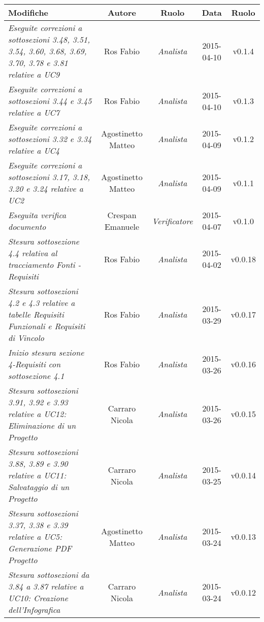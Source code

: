 \begin{table}[h]
\centering
\begin{tabular}{|p{}|c|c|c|c|}
	\toprule
		\textbf{Modifiche} & \textbf{Autore} & \textbf{Ruolo} & \textbf{Data} & \textbf{Ruolo} \\
	\midrule
	\midrule
		\textit{Eseguite correzioni a sottosezioni 3.48, 3.51, 3.54, 3.60, 3.68, 3.69, 3.70, 3.78  e 3.81 relative a UC9} & Ros Fabio & \textit{Analista} & 2015-04-10 & v0.1.4 \\
	\midrule
		\textit{Eseguite correzioni a sottosezioni 3.44 e 3.45 relative a UC7} & Ros Fabio & \textit{Analista} & 2015-04-10 & v0.1.3 \\
	\midrule
		\textit{Eseguite correzioni a sottosezioni 3.32 e 3.34 relative a UC4} & Agostinetto Matteo & \textit{Analista} & 2015-04-09 & v0.1.2 \\ 
	\midrule
		\textit{Eseguite correzioni a sottosezioni 3.17, 3.18, 3.20 e 3.24 relative a UC2} & Agostinetto Matteo & \textit{Analista} & 2015-04-09 & v0.1.1 \\
	\midrule
		\textit{Eseguita verifica documento} & Crespan Emanuele & \textit{Verificatore} & 2015-04-07 & v0.1.0 \\
	\midrule
		\textit{Stesura sottosezione 4.4 relativa al tracciamento Fonti - Requisiti} & Ros Fabio & \textit{Analista} & 2015-04-02 & v0.0.18 \\
	\midrule
		\textit{Stesura sottosezioni 4.2 e 4.3 relative a tabelle Requisiti Funzionali e Requisiti di Vincolo} & Ros Fabio & \textit{Analista} & 2015-03-29 & v0.0.17 \\
	\midrule
		\textit{Inizio stesura sezione 4-Requisiti con sottosezione 4.1} & Ros Fabio & \textit{Analista} & 2015-03-26 & v0.0.16 \\
	\midrule
		\textit{Stesura sottosezioni 3.91, 3.92 e 3.93 relative a UC12: Eliminazione di un Progetto} & Carraro Nicola & \textit{Analista} & 2015-03-26 & v0.0.15 \\
	\midrule
		\textit{Stesura sottosezioni 3.88, 3.89 e 3.90 relative a UC11: Salvataggio di un Progetto} & Carraro Nicola & \textit{Analista} & 2015-03-25 & v0.0.14 \\
	\midrule
		\textit{Stesura sottosezioni 3.37, 3.38 e 3.39 relative a UC5: Generazione PDF Progetto} & Agostinetto Matteo & \textit{Analista} & 2015-03-24 & v0.0.13 \\
	\midrule
		\textit{Stesura sottosezioni da 3.84 a 3.87 relative a UC10: Creazione dell'Infografica} & Carraro Nicola & \textit{Analista} & 2015-03-24 & v0.0.12 \\
	\bottomrule
\end{tabular}	
\end{table}
